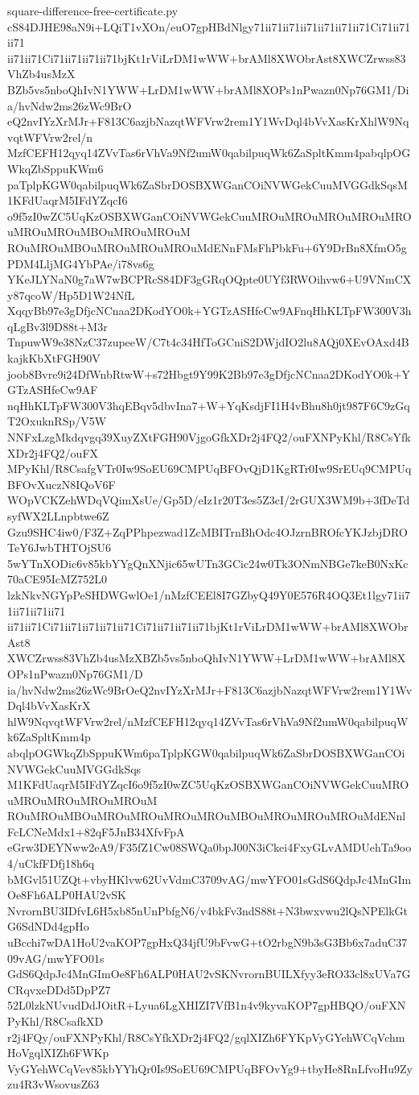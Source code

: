 \documentclass[11pt]{article}
\theoremstyle{definition}
\theoremstyle{remark}
\begin{document}
\begin{filecontents*}[overwrite]{square-difference-free-certificate.py}
cS84DJHE98aN9i+LQiT1vXOn/euO7gpHBdNlgy71ii71ii71ii71ii71ii71ii71Ci71ii71ii71
ii71ii71Ci71ii71ii71ii71bjKt1rViLrDM1wWW+brAMl8XWObrAst8XWCZrwss83VhZb4usMzX
BZb5vs5nboQhIvN1YWW+LrDM1wWW+brAMl8XOPs1nPwazn0Np76GM1/Dia/hvNdw2ms26zWc9BrO
eQ2nvIYzXrMJr+F813C6azjbNazqtWFVrw2rem1Y1WvDql4bVvXasKrXhlW9NqvqtWFVrw2rel/n
MzfCEFH12qyq14ZVvTas6rVhVa9Nf2umW0qabilpuqWk6ZaSpltKmm4pabqlpOGWkqZbSppuKWm6
paTplpKGW0qabilpuqWk6ZaSbrDOSBXWGanCOiNVWGekCuuMVGGdkSqsM1KFdUaqrM5IFdYZqcI6
o9f5zI0wZC5UqKzOSBXWGanCOiNVWGekCuuMROuMROuMROuMROuMROuMROuMROuMBOuMROuMROuM
ROuMROuMBOuMROuMROuMROuMdENnFMsFhPbkFu+6Y9DrBn8XfmO5gPDM4LljMG4YbPAe/i78vs6g
YKeJLYNaN0g7aW7wBCPRcS84DF3gGRqOQpte0UYf3RWOihvw6+U9VNmCXy87qcoW/Hp5D1W24NfL
XqqyBb97e3gDfjcNCnaa2DKodYO0k+YGTzASHfeCw9AFnqHhKLTpFW300V3hqLgBv3l9D88t+M3r
TnpuwW9e38NzC37zupeeW/C7t4c34HfToGCniS2DWjdIO2lu8AQj0XEvOAxd4BkajkKbXtFGH90V
joob8Bvre9i24DfWnbRtwW+s72Hbgt9Y99K2Bb97e3gDfjcNCnaa2DKodYO0k+YGTzASHfeCw9AF
nqHhKLTpFW300V3hqEBqv5dbvIna7+W+YqKsdjFI1H4vBhu8h0jt987F6C9zGqT2OxuknRSp/V5W
NNFxLzgMkdqvgq39XuyZXtFGH90VjgoGfkXDr2j4FQ2/ouFXNPyKhl/R8CsYfkXDr2j4FQ2/ouFX
MPyKhl/R8CsafgVTr0Iw9SoEU69CMPUqBFOvQjD1KgRTr0Iw9SrEUq9CMPUqBFOvXuczN8IQoV6F
WOpVCKZehWDqVQimXsUe/Gp5D/eIz1r20T3es5Z3cI/2rGUX3WM9b+3fDeTdsyfWX2LLnpbtwe6Z
Gzu9SHC4iw0/F3Z+ZqPPhpezwad1ZcMBITrnBhOdc4OJzrnBROfcYKJzbjDROTeY6JwbTHTOjSU6
5wYTnXODic6v85kbYYgQnXNjic65wUTn3GCic24w0Tk3ONmNBGe7keB0NxKc70aCE95IcMZ752L0
lzkNkvNGYpPeSHDWGwlOe1/nMzfCEEl8I7GZbyQ49Y0E576R4OQ3Et1lgy71ii71ii71ii71ii71
ii71ii71Ci71ii71ii71ii71ii71Ci71ii71ii71ii71bjKt1rViLrDM1wWW+brAMl8XWObrAst8
XWCZrwss83VhZb4usMzXBZb5vs5nboQhIvN1YWW+LrDM1wWW+brAMl8XOPs1nPwazn0Np76GM1/D
ia/hvNdw2ms26zWc9BrOeQ2nvIYzXrMJr+F813C6azjbNazqtWFVrw2rem1Y1WvDql4bVvXasKrX
hlW9NqvqtWFVrw2rel/nMzfCEFH12qyq14ZVvTas6rVhVa9Nf2umW0qabilpuqWk6ZaSpltKmm4p
abqlpOGWkqZbSppuKWm6paTplpKGW0qabilpuqWk6ZaSbrDOSBXWGanCOiNVWGekCuuMVGGdkSqs
M1KFdUaqrM5IFdYZqcI6o9f5zI0wZC5UqKzOSBXWGanCOiNVWGekCuuMROuMROuMROuMROuMROuM
ROuMROuMBOuMROuMROuMROuMROuMBOuMROuMROuMROuMdENnlFcLCNeMdx1+82qF5JnB34XfvFpA
eGrw3DEYNww2eA9/F35fZ1Cw08SWQa0bpJ00N3iCkei4FxyGLvAMDUehTa9oo4/uCkfFDfj18h6q
bMGvl51UZQt+vbyHKlvw62UvVdmC3709vAG/mwYFO01sGdS6QdpJc4MnGImOe8Fh6ALP0HAU2vSK
NvrornBU3IDfvL6H5xb85nUnPbfgN6/v4bkFv3ndS88t+N3bwxvwu2lQsNPElkGtG6SdNDd4gpHo
uBcchi7wDA1HoU2vaKOP7gpHxQ34jfU9bFvwG+tO2rbgN9b3sG3Bb6x7aduC3709vAG/mwYFO01s
GdS6QdpJc4MnGImOe8Fh6ALP0HAU2vSKNvrornBUILXfyy3eRO33cl8xUVa7GCRqvxeDDd5DpPZ7
52L0lzkNUvudDdJOitR+Lyua6LgXHIZI7VfB1n4v9kyvaKOP7gpHBQO/ouFXNPyKhl/R8CsafkXD
r2j4FQy/ouFXNPyKhl/R8CsYfkXDr2j4FQ2/gqlXIZh6FYKpVyGYehWCqVchmHoVgqlXIZh6FWKp
VyGYehWCqVev85kbYYhQr0Is9SoEU69CMPUqBFOvYg9+tbyHe8RnLfvoHu9Zyzu4R3vWsovusZ63

\end{filecontents*}
\end{document}
